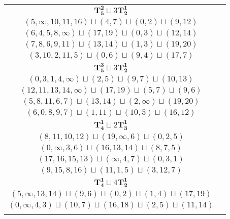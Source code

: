 \documentclass{article}
\begin{document}
\begin{longtable}{|c|c|}
        $\mathbf{T_{5}^{2}} \sqcup 3\mathbf{T_{2}^{1}}$ & \begin{tabular}{c}
        $(1,\infty,13,10,7)\sqcup(2,3)\sqcup(16,15)\sqcup(9,11)$ \\ 
        $(5,\infty,10,11,16)\sqcup(4,7)\sqcup(0,2)\sqcup(9,12)$ \\ 
        $(6,4,5,8,\infty)\sqcup(17,19)\sqcup(0,3)\sqcup(12,14)$ \\ 
        $(7,8,6,9,11)\sqcup(13,14)\sqcup(1,3)\sqcup(19,20)$ \\ 
        $(3,10,2,11,5)\sqcup(0,6)\sqcup(9,4)\sqcup(17,7)$
        \end{tabular} \\ 
        \hline
        $\mathbf{T_{5}^{3}} \sqcup 3\mathbf{T_{2}^{1}}$ & \begin{tabular}{c}
        $(1,\infty,13,5,7)\sqcup(2,3)\sqcup(16,15)\sqcup(9,11)$ \\ 
        $(0,3,1,4,\infty)\sqcup(2,5)\sqcup(9,7)\sqcup(10,13)$ \\ 
        $(12,11,13,14,\infty)\sqcup(17,19)\sqcup(5,7)\sqcup(9,6)$ \\ 
        $(5,8,11,6,7)\sqcup(13,14)\sqcup(2,\infty)\sqcup(19,20)$ \\ 
        $(6,0,8,9,7)\sqcup(1,11)\sqcup(10,5)\sqcup(16,12)$
        \end{tabular} \\ 
        \hline
        $\mathbf{T_{4}^{1}} \sqcup 2\mathbf{T_{3}^{1}}$ & \begin{tabular}{c}
        $(11,13,12,15)\sqcup(9,\infty,1)\sqcup(2,4,5)$ \\ 
        $(8,11,10,12)\sqcup(19,\infty,6)\sqcup(0,2,5)$ \\ 
        $(0,\infty,3,6)\sqcup(16,13,14)\sqcup(8,7,5)$ \\ 
        $(17,16,15,13)\sqcup(\infty,4,7)\sqcup(0,3,1)$ \\ 
        $(9,15,8,16)\sqcup(11,1,5)\sqcup(3,12,7)$
        \end{tabular} \\ 
        \hline
        $\mathbf{T_{4}^{1}} \sqcup 4\mathbf{T_{2}^{1}}$ & \begin{tabular}{c}
        $(9,\infty,8,6)\sqcup(12,15)\sqcup(16,17)\sqcup(1,2)\sqcup(19,20)$ \\ 
        $(5,\infty,13,14)\sqcup(9,6)\sqcup(0,2)\sqcup(1,4)\sqcup(17,19)$ \\ 
        $(0,\infty,4,3)\sqcup(10,7)\sqcup(16,18)\sqcup(2,5)\sqcup(11,14)$ \\ 

\end{tabular}
\end{longtable}
\end{document}
